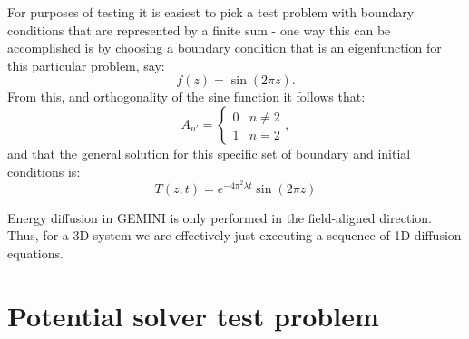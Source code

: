 \documentclass[11pt,letterpaper]{article}
\begin{document}
For purposes of testing it is easiest to pick a test problem with boundary conditions that are represented by a finite sum - one way this can be accomplished is by choosing a boundary condition that is an eigenfunction for this particular problem, say:
\begin{equation}
 f(z) = \sin(2 \pi z).
\end{equation}
From this, and orthogonality of the sine function it follows that:
\begin{equation}
A_{n'} = \left\{ \begin{array}{cc} 0 & n \ne 2 \\ 1 & n=2  \end{array} \right. ,
\end{equation}
and that the general solution for this specific set of boundary and initial conditions is:  
\begin{equation}
T(z,t) = e^{-4 \pi^2 \lambda t} \sin \left( 2 \pi z \right)
\end{equation}

Energy diffusion in GEMINI is only performed in the field-aligned direction.  Thus, for a 3D system we are effectively just executing a sequence of 1D diffusion equations.  


\section{Potential solver test problem}
\end{document}
